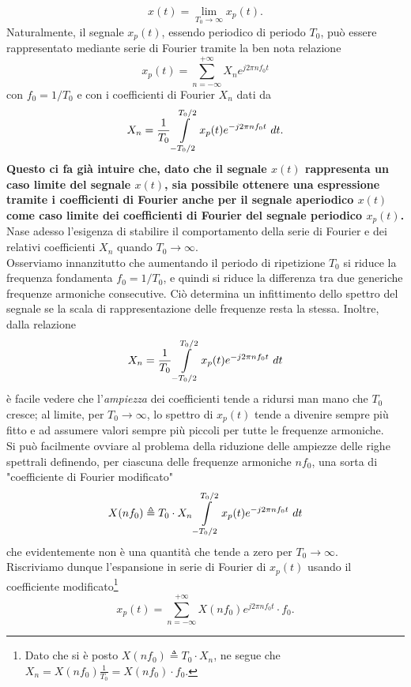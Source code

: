 \documentclass[12pt,oneside,openany]{memoir}
\numberwithin{equation}{subsection}
\newcommand{\dt}{\ dt}
\begin{document}
\begin{equation}
	x(t) = \lim_{T_0 \rightarrow \infty} x_p(t).
\end{equation}
Naturalmente, il segnale $x_p(t)$, essendo periodico di periodo $T_0$, pu\`o essere rappresentato mediante serie di Fourier tramite la ben nota relazione
\[
	x_p(t) = \sum_{n = -\infty}^{+\infty} X_n e^{j 2 \pi n f_0 t}
\]
con $f_0 = 1/T_0$ e con i coefficienti di Fourier $X_n$ dati da
\[
	X_n = \frac{1}{T_0} \int\displaylimits_{-T_0/2}^{T_0/2} x_p(t) e^{-j 2 \pi n f_0 t} \dt.
\]
\textbf{Questo ci fa gi\`a intuire che, dato che il segnale $x(t)$ rappresenta un caso limite del segnale $x(t)$, sia possibile ottenere una espressione tramite i coefficienti di Fourier anche per il segnale aperiodico $x(t)$ come caso limite dei coefficienti di Fourier del segnale periodico $x_p(t)$.}
\bigbreak
Nase adesso l'esigenza di stabilire il comportamento della serie di Fourier e dei relativi coefficienti $X_n$ quando $T_0 \rightarrow \infty$.\\
Osserviamo innanzitutto che aumentando il periodo di ripetizione $T_0$ si riduce la frequenza fondamenta $f_ 0 = 1/T_0$, e quindi si riduce la differenza tra due generiche frequenze armoniche consecutive. Ci\`o determina un infittimento dello spettro del segnale se la scala di rappresentazione delle frequenze resta la stessa. Inoltre, dalla relazione 
\[
	X_n = \frac{1}{T_0} \int\displaylimits_{-T_0/2}^{T_0/2} x_p(t) e^{-j 2 \pi n f_0 t} \dt
\]
\`e facile vedere che l'\textit{ampiezza} dei coefficienti tende a ridursi man mano che $T_0$ cresce; al limite, per $T_0 \rightarrow \infty$, lo spettro di $x_p(t)$ tende a divenire sempre pi\`u fitto e ad assumere valori sempre pi\`u piccoli per tutte le frequenze armoniche.\\
Si pu\`o facilmente ovviare al problema della riduzione delle ampiezze delle righe spettrali definendo, per ciascuna delle frequenze armoniche $nf_0$, una sorta di "coefficiente di Fourier modificato"
\begin{equation}
	X(nf_0) \triangleq T_0 \cdot X_n \int\displaylimits_{-T_0/2}^{T_0/2} x_p(t) e^{-j 2 \pi n f_0 t} \dt
\end{equation}
che evidentemente non \`e una quantit\`a che tende a zero per $T_0 \rightarrow \infty$.\\
Riscriviamo dunque l'espansione in serie di Fourier di $x_p(t)$ usando il coefficiente modificato\footnote{Dato che si \`e posto $X(nf_0) \triangleq T_0 \cdot X_n$, ne segue che $X_n = X(n f_0) \frac{1}{T_0} = X(n f_0) \cdot f_0$.}
\begin{equation}
	x_p(t) = \sum_{n = -\infty}^{+\infty} X(n f_0) e^{j 2 \pi n f_0 t} \cdot f_0.
\end{equation}
\end{document}
